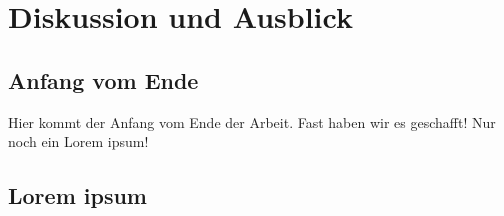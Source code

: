\chapter{Diskussion und Ausblick}

\section{Anfang vom Ende}

Hier kommt der Anfang vom Ende der Arbeit.
Fast haben wir es geschafft! Nur noch ein Lorem ipsum!

\section{Lorem ipsum}


